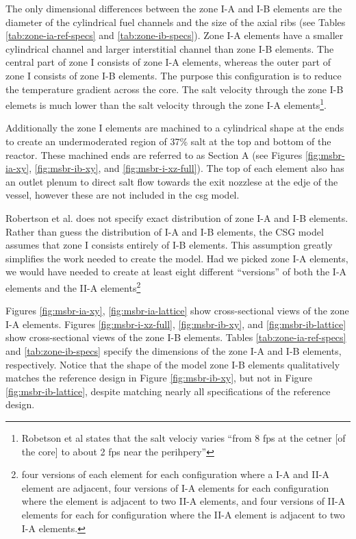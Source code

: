 The only dimensional differences between the zone I-A and I-B elements are the
diameter of the cylindrical fuel channels and the size of the axial ribs (see
Tables \ref{tab:zone-ia-ref-specs} and \ref{tab:zone-ib-specs}). Zone I-A
elements have a smaller cylindrical channel and larger interstitial channel
than zone I-B elements. The central part of zone I consists of zone I-A
elements, whereas the outer part of zone I consists of zone I-B
elements\cite{robertson_conceptual_1971}. The purpose this configuration is to
reduce the temperature gradient across the core. The salt velocity through the
zone I-B elemets is much lower than the salt velocity through the zone I-A
elements\footnote{Robetson et al states that the salt velociy varies ``from 8
fps at the cetner [of the core] to about 2 fps near the
perihpery''\cite{robertson_conceptual_1971}}.

Additionally the zone I elements are machined to a cylindrical shape at the ends
to create an undermoderated region of 37\% salt at the top and bottom of the
reactor\cite{robertson_conceptual_1971}. These machined ends are referred to as
Section A (see Figures \ref{fig:msbr-ia-xy}, \ref{fig:msbr-ib-xy}, and
\ref{fig:msbr-i-xz-full}). The top of each element also has an outlet plenum to
direct salt flow towards the exit nozzlese at the edje of the vessel, however
these are not included in the \Gls{csg} model.

Robertson et al. does not specify exact distribution of zone I-A and I-B
elements. Rather than guess the distribution of I-A and I-B elements, the CSG
model assumes that zone I consists entirely of I-B elements. This assumption
greatly simplifies the work needed to create the model. Had we picked zone I-A
elements, we would have needed to create at least eight different ``versions''
of both the I-A elements and the II-A elements\footnote{four versions of each
element for each configuration where a I-A and II-A element are adjacent,
four versions of I-A elements for each configuration where the element is
adjacent to two II-A elements, and four versions of II-A elements for each for
configuration where the II-A element is adjacent to two I-A elements.}

Figures \ref{fig:msbr-ia-xy}, \ref{fig:msbr-ia-lattice} show cross-sectional
views of the zone I-A elements. Figures \ref{fig:msbr-i-xz-full},
\ref{fig:msbr-ib-xy}, and \ref{fig:msbr-ib-lattice} show cross-sectional views
of the zone I-B elements. Tables \ref{tab:zone-ia-ref-specs} and
\ref{tab:zone-ib-specs} specify the dimensions of the zone I-A and I-B elements,
respectively. Notice that the shape of the model zone I-B elements
qualitatively matches the reference design in Figure \ref{fig:msbr-ib-xy}, but 
not in Figure \ref{fig:msbr-ib-lattice}, despite matching nearly all
specifications of the reference design.

